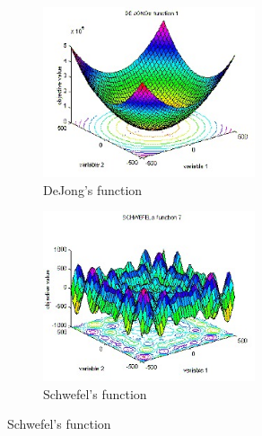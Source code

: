 \documentclass[12pt]{article}
\begin{document}
\begin{center}
  \begin{figure}
  
    \begin{subfigure}{0.5\textwidth}
    \includegraphics[width=0.9\linewidth, height=5cm]{dejong.jpg} 
    \caption{DeJong's function}
    \label{fig:subim1}
    \end{subfigure}
    \begin{subfigure}{0.5\textwidth}
    \includegraphics[width=0.9\linewidth, height=5cm]{schwefel.jpg}
    \caption{Schwefel's function}
    \label{fig:subim2}
    \end{subfigure}
    
  \end{figure}
  
  \begin{figure}
  

\end{figure}
\end{center}
\end{document}
